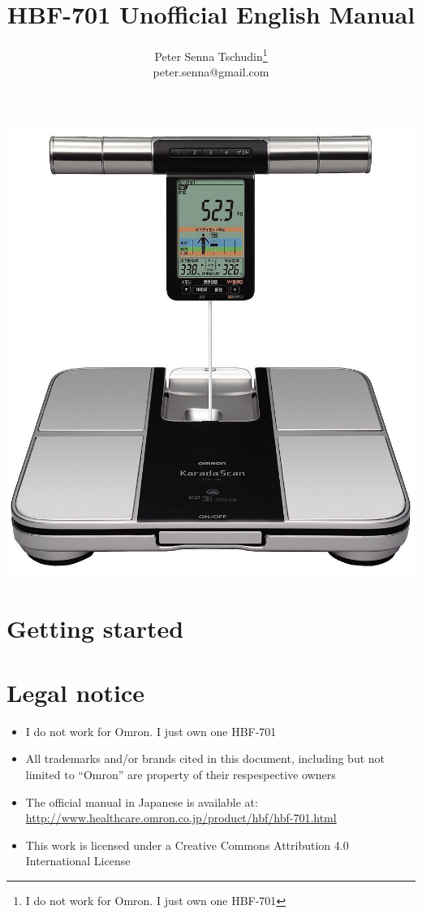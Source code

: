 \documentclass[10pt]{article}
\title{HBF-701 Unofficial English Manual}
\author{Peter Senna Tschudin\footnote{I do not work for Omron. I just own one
HBF-701}\\ {\small peter.senna@gmail.com}}
\begin{document}
\maketitle
\begin{center}
\vspace{-30pt}
\includegraphics[width=0.8\linewidth]{images/hbf701.jpg}
\end{center}
\section{Getting started}
\label{sec:starting}
\section{Legal notice}
\label{sec:legal}
\begin{itemize}
  \item I do not work for Omron. I just own one HBF-701
  \item All trademarks and/or brands cited in this document, including but not
        limited to ``Omron'' are property of their respespective owners
  \item The official manual in Japanese is available at:
        \url{http://www.healthcare.omron.co.jp/product/hbf/hbf-701.html}
  \item This work is licensed under a Creative Commons Attribution 4.0
        International License
\end{itemize}
\end{document}
